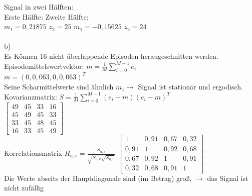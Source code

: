	Signal in zwei H\"alften:\\
	Erste H\"alfte:	\hspace{5cm}										Zweite H\"alfte:\\
	$m_1 = 0,21875$  $z_2 = 25$	\hspace{4cm}								$m_1 = -0,15625$  $z_2 = 24$\\
	\\
	b)\\
	Es K\"onnen 16 nicht \"uberlappende Episoden heraugeschnitten werden.
	Episodemittelswertvektor: $m = \frac{1}{M}\sum_{i=0}^{M-1}e_i$\\
	$m = (0, 0,063, 0, 0,063)^T$\\
	Seine Scharmittelwerte sind \"ahnlich $m_1 \rightarrow$ Signal ist  station\"ar und ergodisch.
	\newpage
	Kovarianzmatrix: $S = \frac{1}{M}\sum_{i=0}^{M-1}(e_i-m)(e_i-m)^T$\\
	$
	\begin{bmatrix}
	49   & 45 & 33	 &  16 \\
	45 & 49 	& 45	 &  33 \\
	33  & 45	& 48 	 & 45 \\
	16 & 33	& 45	 &  49
	\end{bmatrix}
	$\\
	Korrelationsmatrix $R_{u,v} = \frac{S_{u,v}}{\sqrt{S_{u,v} \sqrt{S_{u,v}}}}$
	$
	\begin{bmatrix}
	1   & 0,91 & 0,67	 &  0,32 \\
	0,91 & 1 	& 0,92	 &  0,68 \\
	0,67 & 0,92	& 1 	 & 0,91 \\
	0,32 & 0,68	& 0,91	 &  1
	\end{bmatrix}
	$\\Die Werte abseits der Hauptdiagonale sind (im Betrag) gro{\ss}, $\rightarrow$ das Signal ist nicht  zuf\"allig\\
	
